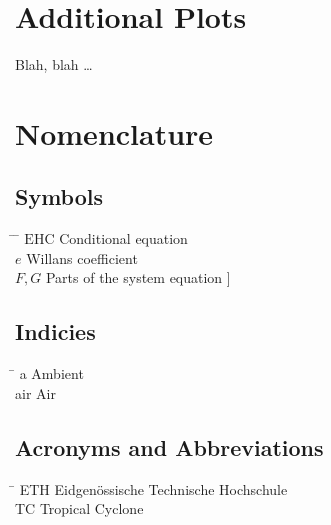 



\chapter{Additional Plots}\label{sec:again_something}

Blah, blah \dots

 \cleardoublepage
 

\chapter*{Nomenclature}\label{chap:symbole}
 
 \section*{Symbols}
\begin{tabbing}
 \hspace*{1.6cm} \= \hspace*{8cm} \= \kill
 $\mathrm{EHC}$ \> Conditional equation \> [$-$] \\[0.5ex]
 $e$ \> Willans coefficient \> [$-$] \\[0.5ex]
 $F,G$ \> Parts of the system equation \> [\unitfrac[]{K}{s}]
\end{tabbing}

\section*{Indicies}
\begin{tabbing}
 \hspace*{1.6cm}  \= \kill
 a \> Ambient \\[0.5ex]
 air \> Air
\end{tabbing}

\section*{Acronyms and Abbreviations}
\begin{tabbing}
 \hspace*{1.6cm}  \= \kill
 ETH \> Eidgen\"{o}ssische Technische Hochschule \\[0.5ex]
 TC \> Tropical Cyclone 
\end{tabbing}

